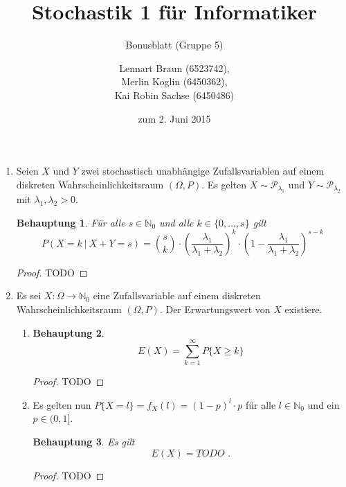 \documentclass[a4paper]{scrartcl}
\title{Stochastik 1 für Informatiker}
\subtitle{Bonusblatt (Gruppe 5)}
\author{
    Lennart Braun (6523742), \\
    Merlin Koglin (6450362), \\
    Kai Robin Sachse (6450486)
}
\date{zum 2. Juni 2015}
\newtheorem*{behaupt}{Behauptung}
\begin{document}
\maketitle

\begin{enumerate}[label=\bfseries\arabic*.]
    \item
        Seien $X$ und $Y$ zwei stochastisch unabhängige Zufallsvariablen auf
        einem diskreten Wahrscheinlichkeitsraum $(\Omega, P)$.
        Es gelten $X \sim \mathcal{P}_{\lambda_1}$ und
        $Y \sim \mathcal{P}_{\lambda_2}$ mit $\lambda_1, \lambda_2 > 0$.
        \begin{behaupt}
            Für alle $s \in \mathbb{N}_0$ und alle $k \in \{0, \ldots, s\}$ gilt
            \begin{equation*}
                P \left( X = k \ |\ X + Y = s \right) = \binom{s}{k} \cdot
                \left( \frac{\lambda_1}{\lambda_1 + \lambda_2} \right)^k \cdot
                \left( 1 - \frac{\lambda_1}{\lambda_1 + \lambda_2} \right)^{s-k}
            \end{equation*}
        \end{behaupt}
        \begin{proof}
            TODO
        \end{proof}

    \item
        Es sei $X\colon \Omega \to \mathbb{N}_0$ eine Zufallsvariable auf einem
        diskreten Wahrscheinlichkeitsraum $(\Omega, P)$.
        Der Erwartungswert von $X$ existiere.
        \begin{enumerate}[label=(\alph*)]
            \item
                \begin{behaupt}
                    \begin{equation*}
                        E(X) = \sum_{k=1}^\infty P\{X \geq k\}
                    \end{equation*}
                \end{behaupt}
                \begin{proof}
                    TODO
                \end{proof}

            \item
                Es gelten nun $P\{X = l\} = f_X(l) = (1 - p)^l \cdot p$ für alle
                $l \in \mathbb{N}_0$ und ein $p \in (0, 1]$.
                \begin{behaupt}
                    Es gilt
                    \begin{equation*}
                        E(X) = TODO
                        \text{ .}
                    \end{equation*}
                \end{behaupt}
                \begin{proof}
                    TODO
                \end{proof}

        \end{enumerate}
\end{enumerate}
\end{document}

